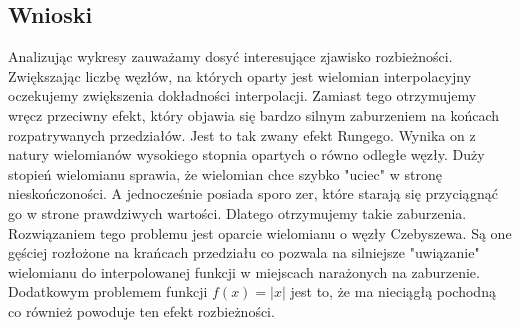\documentclass[]{article}
\begin{document}
\subsection{Wnioski}
Analizując wykresy zauważamy dosyć interesujące zjawisko rozbieżności. Zwiększając liczbę węzłów, na których oparty jest wielomian interpolacyjny oczekujemy zwiększenia dokładności interpolacji. Zamiast tego otrzymujemy wręcz przeciwny efekt, który objawia się bardzo silnym zaburzeniem na końcach rozpatrywanych przedziałów. Jest to tak zwany efekt Rungego. Wynika on z natury wielomianów wysokiego stopnia opartych o równo odległe węzły. Duży stopień wielomianu sprawia, że wielomian chce szybko "uciec" w stronę nieskończoności. A jednocześnie posiada sporo zer, które starają się przyciągnąć go w strone prawdziwych wartości. Dlatego otrzymujemy takie zaburzenia. Rozwiązaniem tego problemu jest oparcie wielomianu o węzły Czebyszewa. Są one gęściej rozłożone na krańcach przedziału co pozwala na silniejsze "uwiązanie" wielomianu do interpolowanej funkcji w miejscach narażonych na zaburzenie. Dodatkowym problemem funkcji $f(x) = |x|$ jest to, że ma nieciągłą pochodną co również powoduje ten efekt rozbieżności. 
\end{document}
